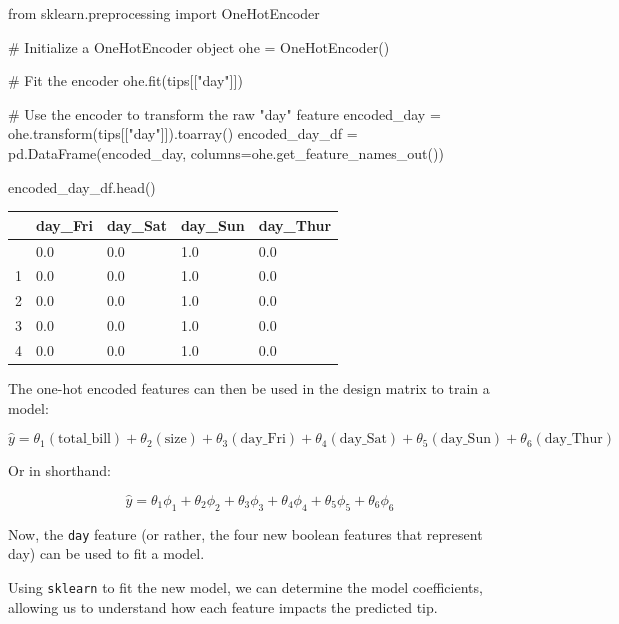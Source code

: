 \documentclass[
  letterpaper,
  DIV=11,
  numbers=noendperiod]{scrreprt}
\newenvironment{Shaded}{\begin{snugshade}}{\end{snugshade}}
\newcommand{\CommentTok}[1]{\textcolor[rgb]{0.37,0.37,0.37}{#1}}
\newcommand{\ImportTok}[1]{\textcolor[rgb]{0.00,0.46,0.62}{#1}}
\newcommand{\NormalTok}[1]{\textcolor[rgb]{0.00,0.23,0.31}{#1}}
\newcommand{\OperatorTok}[1]{\textcolor[rgb]{0.37,0.37,0.37}{#1}}
\newcommand{\StringTok}[1]{\textcolor[rgb]{0.13,0.47,0.30}{#1}}
\begin{document}
\begin{Shaded}
\begin{Highlighting}[]
\ImportTok{from}\NormalTok{ sklearn.preprocessing }\ImportTok{import}\NormalTok{ OneHotEncoder}

\CommentTok{\# Initialize a OneHotEncoder object}
\NormalTok{ohe }\OperatorTok{=}\NormalTok{ OneHotEncoder()}

\CommentTok{\# Fit the encoder}
\NormalTok{ohe.fit(tips[[}\StringTok{"day"}\NormalTok{]])}

\CommentTok{\# Use the encoder to transform the raw "day" feature}
\NormalTok{encoded\_day }\OperatorTok{=}\NormalTok{ ohe.transform(tips[[}\StringTok{"day"}\NormalTok{]]).toarray()}
\NormalTok{encoded\_day\_df }\OperatorTok{=}\NormalTok{ pd.DataFrame(encoded\_day, columns}\OperatorTok{=}\NormalTok{ohe.get\_feature\_names\_out())}

\NormalTok{encoded\_day\_df.head()}
\end{Highlighting}
\end{Shaded}

\begin{longtable}[]{@{}lllll@{}}
\toprule\noalign{}
& day\_Fri & day\_Sat & day\_Sun & day\_Thur \\
\midrule\noalign{}
\endhead
\bottomrule\noalign{}
\endlastfoot
0 & 0.0 & 0.0 & 1.0 & 0.0 \\
1 & 0.0 & 0.0 & 1.0 & 0.0 \\
2 & 0.0 & 0.0 & 1.0 & 0.0 \\
3 & 0.0 & 0.0 & 1.0 & 0.0 \\
4 & 0.0 & 0.0 & 1.0 & 0.0 \\
\end{longtable}

The one-hot encoded features can then be used in the design matrix to
train a model:

\[\hat{y} = \theta_1 (\text{total}\_\text{bill}) + \theta_2 (\text{size}) + \theta_3 (\text{day}\_\text{Fri}) + \theta_4 (\text{day}\_\text{Sat}) + \theta_5 (\text{day}\_\text{Sun}) + \theta_6 (\text{day}\_\text{Thur})\]

Or in shorthand:

\[\hat{y} = \theta_{1}\phi_{1} + \theta_{2}\phi_{2} + \theta_{3}\phi_{3} + \theta_{4}\phi_{4} + \theta_{5}\phi_{5} + \theta_{6}\phi_{6}\]

Now, the \texttt{day} feature (or rather, the four new boolean features
that represent day) can be used to fit a model.

Using \texttt{sklearn} to fit the new model, we can determine the model
coefficients, allowing us to understand how each feature impacts the
predicted tip.
\end{document}
